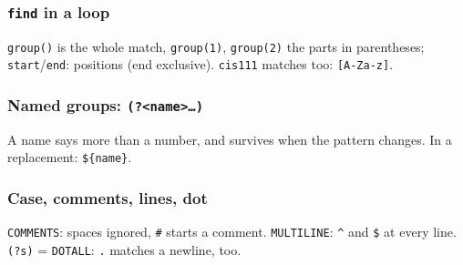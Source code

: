 \documentclass[aspectratio=169,10pt,compress]{beamer}
\begin{document}
\begin{frame}[t,fragile] \frametitle{\texttt{find} in a loop}

  \vspace{0.2em}
  \small \texttt{group()} is the whole match, \texttt{group(1)}, \texttt{group(2)} the parts in parentheses; \texttt{start}/\texttt{end}: positions (end exclusive). \texttt{cis111} matches too: \texttt{[A-Za-z]}.
\end{frame}





\begin{frame}[t,fragile] \frametitle{Named groups: \texttt{(?<name>\dots)}}

  \vspace{0.2em}
  \small A name says more than a number, and survives when the pattern changes. In a replacement: \texttt{\$\{name\}}.
\end{frame}





\begin{frame}[t,fragile] \frametitle{Case, comments, lines, dot}

  \vspace{0.2em}
  \small \texttt{COMMENTS}: spaces ignored, \texttt{\#} starts a comment.
  \texttt{MULTILINE}: \texttt{\textasciicircum} and \texttt{\$} at every line. \texttt{(?s)} = \texttt{DOTALL}: \texttt{.} matches a newline, too.
\end{frame}

\end{document}
